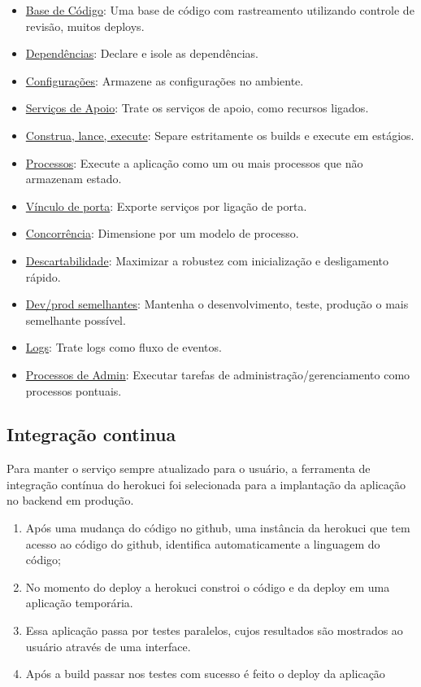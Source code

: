 \begin{itemize}
    \item \underline{Base de Código}: Uma base de código com rastreamento utilizando controle de revisão, muitos \glspl{deploy}.
    \item \underline{Dependências}: Declare e isole as dependências.
    \item \underline{Configurações}: Armazene as configurações no ambiente.
    \item \underline{Serviços de Apoio}: Trate os serviços de apoio, como recursos ligados.
    \item \underline{Construa, lance, execute}: Separe estritamente os builds e execute em estágios.
    \item \underline{Processos}: Execute a aplicação como um ou mais processos que não armazenam estado.
    \item \underline{Vínculo de porta}: Exporte serviços por ligação de porta.
    \item \underline{Concorrência}: Dimensione por um modelo de processo.
    \item \underline{Descartabilidade}: Maximizar a robustez com inicialização e desligamento rápido.
    \item \underline{Dev/prod semelhantes}: Mantenha o desenvolvimento, teste, produção o mais semelhante possível.
    \item \underline{Logs}: Trate logs como fluxo de eventos.
    \item \underline{Processos de Admin}: Executar tarefas de administração/gerenciamento como processos pontuais.
\end{itemize}

\subsection{Integração continua}
Para manter o serviço sempre atualizado para o usuário, a ferramenta de integração contínua do \gls{herokuci} foi selecionada para a implantação da aplicação no \gls{backend} em produção.

\begin{enumerate}
    \item Após uma mudança do código no \gls{github}, uma instância da \gls{herokuci} que tem acesso ao código do \gls{github}, identifica automaticamente
    a linguagem do código; 
    \item No momento do \gls{deploy} a \gls{herokuci} constroi o código e da \gls{deploy} em uma aplicação temporária.
    \item Essa aplicação passa por testes paralelos, cujos resultados são mostrados ao usuário através de uma interface.
    \item Após a build passar nos testes com sucesso é feito o \gls{deploy} da aplicação 
\end{enumerate}

